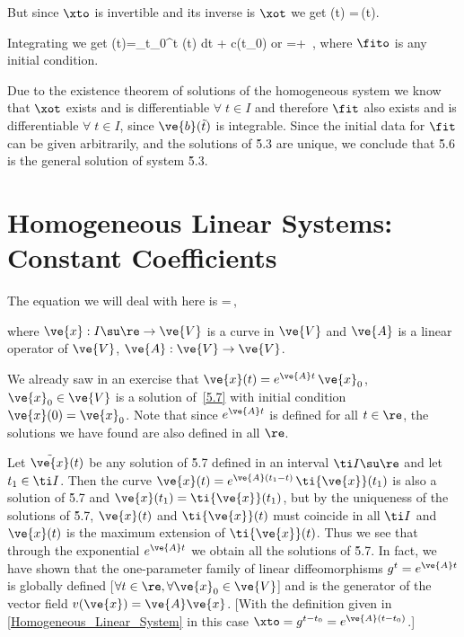 But since $\xto$ is invertible and its inverse is $\xot$ we get
\beq
{} (t) =\xot\,(t).
\eeq

\noi Integrating we get
\beq
{}(t)=\int_{t_0}^t \xoti {}(\tilde t) \;d\tilde t + c(t_0)
\eeq
\noi or
\beq
\fit=\xto{} +
\xto\,\fito ,
\label{5.6}
\eeq
\noi where $\fito$ is any initial condition.

\espa

Due to the existence theorem of solutions of the homogeneous system
we know that $\xot$ exists and is differentiable $\forall\;t\in I$ and therefore
$\fit$ also exists and is differentiable $\forall\; t\in I$,
since $\ve{b}(\tilde t)$ is integrable. Since the initial data for $\fit$
can be given arbitrarily, and the solutions of \r{5.3} are
unique, we conclude that \r{5.6} is the general solution of system \r{5.3}.




\section{Homogeneous Linear Systems: Constant Coefficients}
\label{Homogeneous_Linear_Systems:_Constant_Coefficients}

The equation we will deal with here is 
\beq
{}=\,,      \label{5.7}
\eeq

\noi where $\ve{x} :I\su \re\to \ve{V}$ is a curve in $\ve{V}$ and $\ve{A}$ is a
linear operator of $\ve{V}$, $\ve{A}:\ve{V}\to \ve{V}$.

We already saw in an exercise that $\ve{x}(t)=e^{\ve{A}t}\,\ve{x}_0$, $\ve{x}_0\in \ve{V}$
is a solution of~\ref{5.7} with initial condition
$\ve{x}(0)=\ve{x}_0$. Note that since $e^{\ve{A}t}$ is defined for all
$t\in\re$, the solutions we have found are also
defined in all $\re$.

Let $\tilde{\ve{x}}(t)$ be any solution of \r{5.7} defined in an
interval $\ti I\su\re$ and let $t_1\in\ti I$. Then the curve
$\ve{x}(t)=e^{\ve{A}(t_1-t)}\,\ti{\ve{x}} (t_1)$ is also a solution
of \r{5.7} and $\ve{x}(t_1)=\ti{\ve{x}}(t_1)$, but by the uniqueness of the solutions
of \r{5.7}, $\ve{x}(t)$ and $\ti{\ve{x}}(t)$ must coincide in all $\ti I$ and
$\ve{x}(t)$ is the maximum extension of $\ti{\ve{x}}(t)$. Thus we see that
through the exponential $e^{\ve{A}t}$ we obtain all the solutions
of \r{5.7}. In fact, we have shown that the one-parameter family
of linear diffeomorphisms $g^t=e^{\ve{A}t}$ is globally defined
[$\forall t\in\re,\forall \ve{x}_0\in \ve{V}$] and is the generator of the vector
field $v(\ve{x})=\ve{A} \ve{x}$. 
[With the definition given in \ref{Homogeneous_Linear_System} in this case
$\xto=g^{t-t_0}=e^{\ve{A}(t-t_0)}$.]
\espa

